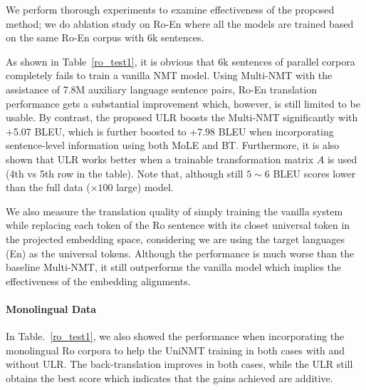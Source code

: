 We perform  thorough experiments to examine effectiveness of the proposed method; we do ablation study on Ro-En where  all the models are trained based on the same Ro-En corpus with 6k sentences.  


As shown in Table~\ref{ro_test1}, it is obvious that 6k sentences of parallel corpora  completely fails to train a vanilla  NMT model. Using Multi-NMT with the assistance of 7.8M auxiliary language sentence pairs, Ro-En translation performance gets a substantial improvement which, however, is still limited to be usable. By contrast, the proposed ULR boosts the Multi-NMT significantly with +5.07 BLEU, which is further boosted to +7.98 BLEU when incorporating sentence-level information using both MoLE and BT.  Furthermore, it is also shown that ULR works better when a trainable transformation matrix $A$ is used (4th vs 5th row in the table). Note that, although still $5\sim 6$ BLEU scores lower than the full data ($\times 100$ large) model. 

We also measure the translation quality of simply training the vanilla system while replacing each  token of the Ro sentence with its closet universal token in the projected embedding space, considering we are using the target languages (En) as the universal tokens. Although the performance is much worse than the baseline Multi-NMT, it still outperforms the vanilla model which implies the effectiveness of the embedding alignments.

\paragraph{Monolingual Data}
In Table.~\ref{ro_test1},  we also showed the performance when incorporating the monolingual Ro corpora to help the UniNMT training in both cases with and without ULR. The back-translation improves in both cases, while the  ULR  still obtains the best score  which indicates that the gains achieved are additive.

